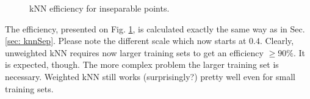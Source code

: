 \begin{figure}
\hfill
{}
\hfill
\caption{kNN efficiency for inseparable points.}
\label{fig: knnInSepRes}
\end{figure}

The efficiency, presented on Fig. \ref{fig: knnInSepRes}, is calculated exactly the same way as in Sec. \ref{sec: knnSep}. Please note the different scale which now starts at $0.4$. Clearly, unweighted kNN requires now larger training sets to get an efficiency $\geq 90\%$. It is expected, though. The more complex problem the larger training set is necessary. Weighted kNN still works (surprisingly?) pretty well even for small training sets.